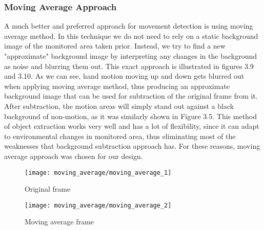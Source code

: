 	\subsubsection{Moving Average Approach}
	A much better and preferred approach for movement detection is using moving average method. In this technique we do not need to rely on a static background image of the monitored area taken prior. Instead, we try to find a new "approximate" background image by interpreting any changes in the background as noise and blurring them out. This exact approach is illustrated in figures 3.9 and 3.10. As we can see, hand motion moving up and down gets blurred out when applying moving average method, thus producing an approximate background image that can be used for subtraction of the original frame from it. After subtraction, the motion areas will simply stand out against a black background of non-motion, as it was similarly shown in Figure 3.5. This method of object extraction works very well and has a lot of flexibility, since it can adapt to environmental changes in monitored area, thus eliminating most of the weaknesses that background subtraction approach has. For these reasons, moving average approach was chosen for our design.
	\begin{figure}[ht]
		\begin{minipage}[b]{0.50 \linewidth}
		\centering
		\texttt{[image: moving\_average/moving\_average\_1]}
		\caption{Original frame}
		\end{minipage}
		\begin{minipage}[b]{0.50 \linewidth}
		\centering
		\texttt{[image: moving\_average/moving\_average\_2]}
		\caption{Moving average frame}
		\end{minipage}
	\end{figure}
	

